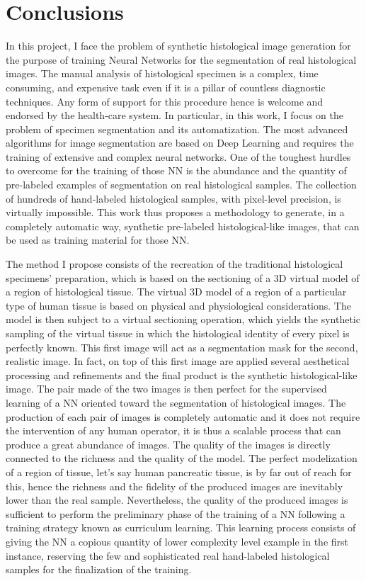 \chapter*{Conclusions}
\label{chap:concl}

In this project, I face the problem of synthetic histological image generation for the purpose of training Neural Networks for the segmentation of real histological images. The manual analysis of histological specimen is a complex, time consuming, and expensive task even if it is a pillar of countless diagnostic techniques. Any form of support for this procedure hence is welcome and endorsed by the health-care system. In particular, in this work, I focus on the problem of specimen segmentation and its automatization. The most advanced algorithms for image segmentation are based on Deep Learning and requires the training of extensive and complex neural networks. One of the toughest hurdles to overcome for the training of those NN is the abundance and the quantity of pre-labeled examples of segmentation on real histological samples. The collection of hundreds of hand-labeled histological samples, with pixel-level precision, is virtually impossible. This work thus proposes a methodology to generate, in a completely automatic way, synthetic pre-labeled histological-like images, that can be used as training material for those NN.

The method I propose consists of the recreation of the traditional histological specimens' preparation, which is based on the sectioning of a 3D virtual model of a region of histological tissue. The virtual 3D model of a region of a particular type of human tissue is based on physical and physiological considerations. The model is then subject to a virtual sectioning operation, which yields the synthetic sampling of the virtual tissue in which the histological identity of every pixel is perfectly known. This first image will act as a segmentation mask for the second, realistic image. In fact, on top of this first image are applied several aesthetical processing and refinements and the final product is the synthetic histological-like image. The pair made of the two images is then perfect for the supervised learning of a NN oriented toward the segmentation of histological images. The production of each pair of images is completely automatic and it does not require the intervention of any human operator, it is thus a scalable process that can produce a great abundance of images. The quality of the images is directly connected to the richness and the quality of the model. The perfect modelization of a region of tissue, let's say human pancreatic tissue, is by far out of reach for this, hence the richness and the fidelity of the produced images are inevitably lower than the real sample. Nevertheless, the quality of the produced images is sufficient to perform the preliminary phase of the training of a NN following a training strategy known as curriculum learning. This learning process consists of giving the NN a copious quantity of lower complexity level example in the first instance, reserving the few and sophisticated real hand-labeled histological samples for the finalization of the training.

